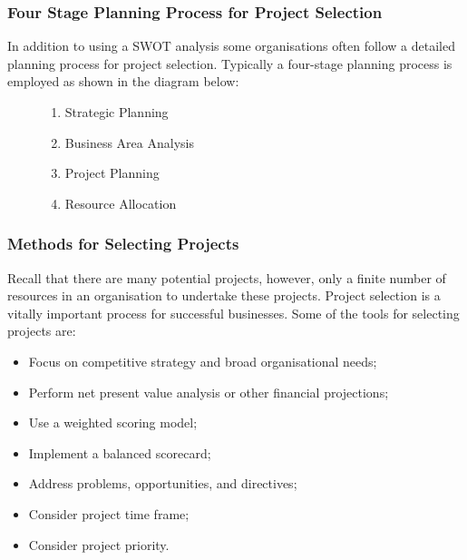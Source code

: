\documentclass[aspectratio=169]{beamer}
\begin{document}
\begin{frame}
\frametitle{Four Stage Planning Process for Project Selection}
In addition to using a SWOT analysis some organisations often follow a detailed planning process for project selection. Typically a four-stage planning process is employed as shown in the diagram below:
\vspace{0.5cm}
\begin{figure}
\begin{enumerate}
\item Strategic Planning
\item Business Area Analysis
\item Project Planning
\item Resource Allocation
\end{enumerate}
\end{figure}
\end{frame}
\begin{frame}
\frametitle{Methods for Selecting Projects}
Recall that there are many potential projects, however, only a finite number of resources in an organisation to undertake these projects. Project selection is a vitally important process for successful businesses. Some of the tools for selecting projects are:
\vspace{0.5cm}
\begin{itemize}
\item Focus on competitive strategy and broad organisational needs;
\item Perform net present value analysis or other financial projections;
\item Use a weighted scoring model;
\item Implement a balanced scorecard;
\item Address problems, opportunities, and directives;
\item Consider project time frame;
\item Consider project priority.
\end{itemize}
\end{frame}
\end{document}
